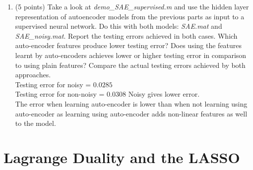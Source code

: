 \documentclass[english]{article}
\begin{document}
\begin{enumerate}
\item (5 points) Take a look at \textit{demo\_SAE\_supervised.m} and use the hidden layer representation of autoencoder models from the previous parts as input to a supervised neural network. Do this with both models: \textit{SAE.mat} and \textit{SAE\_noisy.mat}. Report the testing errors achieved in both cases. Which auto-encoder features produce lower testing error? Does using the features learnt by auto-encoders achieves lower or higher testing error in comparison to using plain features? Compare the actual testing errors achieved by both approaches. \\
Testing error for noisy = $0.0285$ \\
Testing error for non-noisy = $0.0308$
Noisy gives lower error. \\
The error when learning auto-encoder is lower than when not learning using auto-encoder as learning using auto-encoder adds non-linear features as well to the model.\\


\end{enumerate}

\section{Lagrange Duality and the LASSO}
\label{sec:lag}
\end{document}
